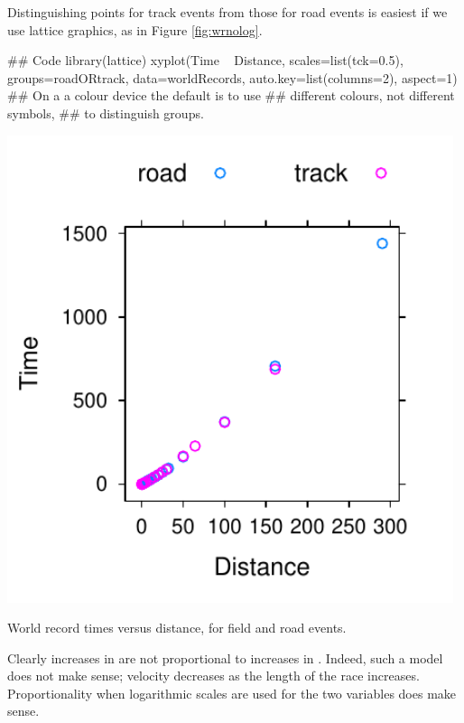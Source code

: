Distinguishing points for track events from those for road events is
easiest if we use lattice graphics, as in Figure \ref{fig:wrnolog}.

\begin{Schunk}
\begin{Sinput}
## Code
library(lattice)
xyplot(Time ~ Distance, scales=list(tck=0.5),
       groups=roadORtrack, data=worldRecords,
       auto.key=list(columns=2), aspect=1)
## On a a colour device the default is to use
## different colours, not different symbols,
## to distinguish groups.
\end{Sinput}
\end{Schunk}

\begin{marginfigure}
\begin{Schunk}


\centerline{\includegraphics[width=0.98\textwidth]{figs/05-trackVSroad-1} }

\end{Schunk}
\caption{World record times versus distance, for field and road
  events.\label{fig:wrnolog}}
\end{marginfigure}

Clearly increases in  are not proportional to increases in
.  Indeed, such a model does not make sense; velocity
decreases as the length of the race increases.  Proportionality when
logarithmic scales are used for the two variables does make sense.

